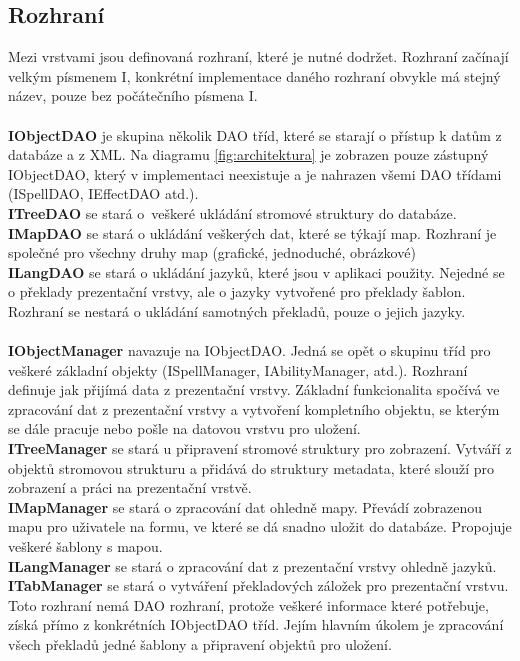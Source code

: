 \documentclass[thesis=B,czech]{resources/FITthesis}[2012/06/26]
\begin{document}
\subsection{Rozhraní}
Mezi vrstvami jsou definovaná rozhraní, které je nutné dodržet. Rozhraní začínají velkým písmenem I, konkrétní implementace daného rozhraní obvykle má stejný název, pouze bez počátečního písmena I.\\
\\
\textbf{IObjectDAO} je skupina několik DAO tříd, které se starají o přístup k datům z databáze a z XML. Na diagramu \ref{fig:architektura} je zobrazen pouze zástupný IObjectDAO, který v implementaci neexistuje a je nahrazen všemi DAO třídami (ISpellDAO, IEffectDAO atd.).\\
\textbf{ITreeDAO} se stará o~veškeré ukládání stromové struktury do databáze. \\
\textbf{IMapDAO} se stará o ukládání veškerých dat, které se týkají map. Rozhraní je společné pro všechny druhy map (grafické, jednoduché, obrázkové)\\
\textbf{ILangDAO} se stará o ukládání jazyků, které jsou v aplikaci použity. Nejedné se o překlady prezentační vrstvy, ale o jazyky vytvořené pro překlady šablon. Rozhraní se nestará o ukládání samotných překladů, pouze o jejich jazyky.\\
\\
\textbf{IObjectManager} navazuje na IObjectDAO. Jedná se opět o skupinu tříd pro veškeré základní objekty (ISpellManager, IAbilityManager, atd.). Rozhraní definuje jak přijímá data z prezentační vrstvy. Základní funkcionalita spočívá ve zpracování dat z prezentační vrstvy a vytvoření kompletního objektu, se kterým se dále pracuje nebo pošle na datovou vrstvu pro uložení.\\
\textbf{ITreeManager} se stará u připravení stromové struktury pro zobrazení. Vytváří z objektů stromovou strukturu a přidává do struktury metadata, které slouží pro zobrazení a práci na prezentační vrstvě.\\
\textbf{IMapManager} se stará o zpracování dat ohledně mapy. Převádí zobrazenou mapu pro uživatele na formu, ve které se dá snadno uložit do databáze. Propojuje veškeré šablony s mapou.\\
\textbf{ILangManager} se stará o zpracování dat z prezentační vrstvy ohledně jazyků.\\
\textbf{ITabManager} se stará o vytváření překladových záložek pro prezentační vrstvu. Toto rozhraní nemá DAO rozhraní, protože veškeré informace které potřebuje, získá přímo z konkrétních IObjectDAO tříd. Jejím hlavním úkolem je zpracování všech překladů jedné šablony a připravení objektů pro uložení.\\
\end{document}
